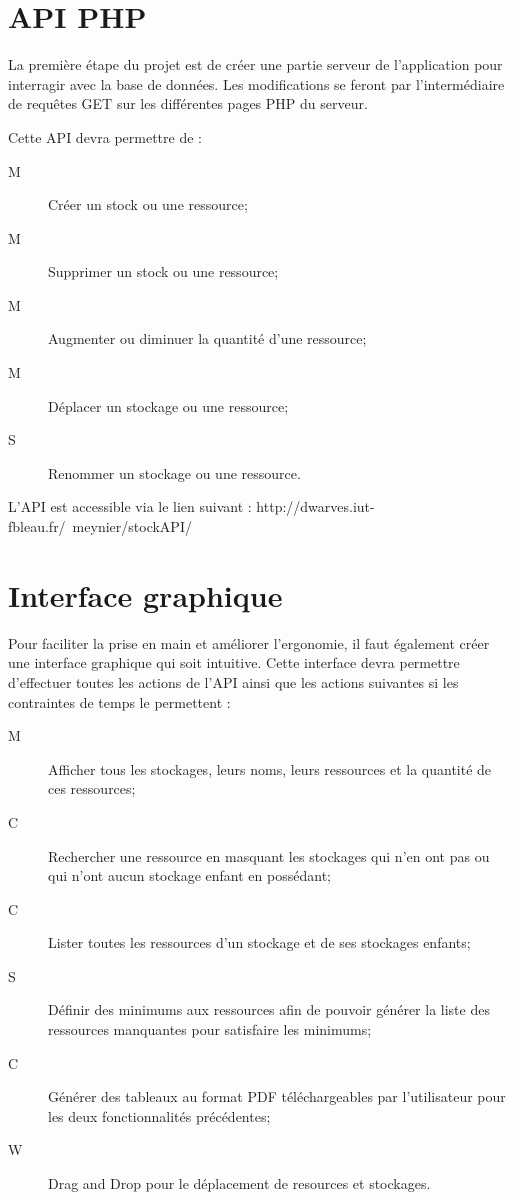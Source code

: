\documentclass[a4paper, 12pt]{report}
\begin{document}
	\section{API PHP}
		La première étape du projet est de créer une partie serveur de l’application pour interragir avec la base de données. Les modifications se feront par l’intermédiaire de requêtes GET sur les différentes pages PHP du serveur. 

		Cette API devra permettre de : 
		\begin{description}
			\item [M] Créer un stock ou une ressource;
			\item [M] Supprimer un stock ou une ressource;
			\item [M] Augmenter ou diminuer la quantité d’une ressource;
			\item [M] Déplacer un stockage ou une ressource;
			\item [S] Renommer un stockage ou une ressource.
		\end{description}

		L’API est accessible via le lien suivant : http://dwarves.iut-fbleau.fr/~meynier/stockAPI/ 

	\section{Interface graphique}
		Pour faciliter la prise en main et améliorer l’ergonomie, il faut également créer une interface graphique qui soit intuitive. Cette interface devra permettre d’effectuer toutes les actions de l'API ainsi que les actions suivantes si les contraintes de temps le permettent : 

		\begin{description}
		    \item [M] Afficher tous les stockages, leurs noms, leurs ressources et la quantité de ces ressources;
		    \item [C] Rechercher une ressource en masquant les stockages qui n’en ont pas ou qui n’ont aucun stockage enfant en possédant;
		    \item [C] Lister toutes les ressources d’un stockage et de ses stockages enfants;
		    \item [S] Définir des minimums aux ressources afin de pouvoir générer la liste des ressources manquantes pour satisfaire les minimums;
		    \item [C] Générer des tableaux au format PDF téléchargeables par l'utilisateur pour les deux fonctionnalités précédentes;
		    \item [W] Drag and Drop pour le déplacement de resources et stockages.

		\end{description}
\end{document}
